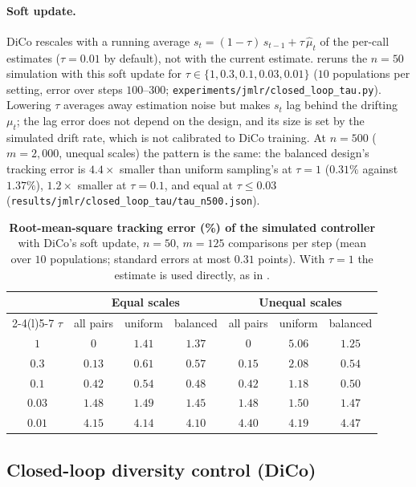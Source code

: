 \paragraph{Soft update.} DiCo rescales with a running average
$s_t=(1-\tau)\,s_{t-1}+\tau\,\widehat\mu_t$ of the per-call estimates ($\tau=0.01$ by
default), not with the current estimate.  reruns the $n=50$ simulation
with this soft update for $\tau\in\{1,0.3,0.1,0.03,0.01\}$ ($10$ populations per setting,
error over steps $100$--$300$; \texttt{experiments/\allowbreak jmlr/\allowbreak closed\_loop\_tau.py}). Lowering
$\tau$ averages away estimation noise but makes $s_t$ lag behind the drifting $\mu_t$;
the lag error does not depend on the design, and its size is set by the simulated drift
rate, which is not calibrated to DiCo training. At $n=500$ ($m=2{,}000$, unequal scales)
the pattern is the same: the balanced design's tracking error is $4.4\times$ smaller than
uniform sampling's at $\tau=1$ ($0.31\%$ against $1.37\%$), $1.2\times$ smaller at
$\tau=0.1$, and equal at $\tau\le0.03$ (\texttt{results/jmlr/closed\_loop\_tau/tau\_n500.json}).

\begin{table}[ht]
\centering
\small
\caption{\textbf{Root-mean-square tracking error (\%) of the simulated controller} with DiCo's soft
update, $n=50$, $m=125$ comparisons per step (mean over $10$ populations; standard errors
at most $0.31$ points). With $\tau=1$ the estimate is used directly, as in
.}
\label{tab:tau}
\begin{tabular}{@{}c ccc ccc@{}}
\toprule
& \multicolumn{3}{c}{Equal scales} & \multicolumn{3}{c}{Unequal scales} \\
\cmidrule(lr){2-4}\cmidrule(l){5-7}
$\tau$ & all pairs & uniform & balanced & all pairs & uniform & balanced \\
\midrule
$1$ & $0$ & $1.41$ & $1.37$ & $0$ & $5.06$ & $1.25$ \\
$0.3$ & $0.13$ & $0.61$ & $0.57$ & $0.15$ & $2.08$ & $0.54$ \\
$0.1$ & $0.42$ & $0.54$ & $0.48$ & $0.42$ & $1.18$ & $0.50$ \\
$0.03$ & $1.48$ & $1.49$ & $1.45$ & $1.48$ & $1.50$ & $1.47$ \\
$0.01$ & $4.15$ & $4.14$ & $4.10$ & $4.40$ & $4.19$ & $4.47$ \\
\bottomrule
\end{tabular}
\end{table}

\subsection{Closed-loop diversity control (DiCo)}
\label{app:exp-details:dico}

